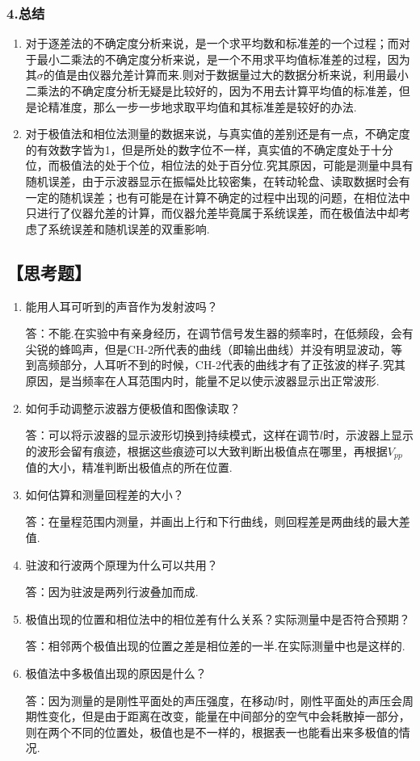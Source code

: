 \documentclass[12pt,a4paper,UTF8]{ctexart}
\begin{document}
	\subsubsection*{4.总结}
	\begin{enumerate}[(1)]
	\item 对于逐差法的不确定度分析来说，是一个求平均数和标准差的一个过程；而对于最小二乘法的不确定度分析来说，是一个不用求平均值标准差的过程，因为其$\sigma$的值是由仪器允差计算而来.则对于数据量过大的数据分析来说，利用最小二乘法的不确定度分析无疑是比较好的，因为不用去计算平均值的标准差，但是论精准度，那么一步一步地求取平均值和其标准差是较好的办法.
	\item 对于极值法和相位法测量的数据来说，与真实值的差别还是有一点，不确定度的有效数字皆为1，但是所处的数字位不一样，真实值的不确定度处于十分位，而极值法的处于个位，相位法的处于百分位.究其原因，可能是测量中具有随机误差，由于示波器显示在振幅处比较密集，在转动轮盘、读取数据时会有一定的随机误差；也有可能是在计算不确定的过程中出现的问题，在相位法中只进行了仪器允差的计算，而仪器允差毕竟属于系统误差，而在极值法中却考虑了系统误差和随机误差的双重影响.
	\end{enumerate}
	\subsection*{【思考题】}
	\begin{enumerate}[(1)]
	\item 能用人耳可听到的声音作为发射波吗？\par
	答：不能.在实验中有亲身经历，在调节信号发生器的频率时，在低频段，会有尖锐的蜂鸣声，但是CH-2所代表的曲线（即输出曲线）并没有明显波动，等到高频部分，人耳听不到的时候，CH-2代表的曲线才有了正弦波的样子.究其原因，是当频率在人耳范围内时，能量不足以使示波器显示出正常波形.
	\item 如何手动调整示波器方便极值和图像读取？\par
	答：可以将示波器的显示波形切换到持续模式，这样在调节$l$时，示波器上显示的波形会留有痕迹，根据这些痕迹可以大致判断出极值点在哪里，再根据$V_{pp}$值的大小，精准判断出极值点的所在位置.
	\item 如何估算和测量回程差的大小？\par
	答：在量程范围内测量，并画出上行和下行曲线，则回程差是两曲线的最大差值.
	\item 驻波和行波两个原理为什么可以共用？\par
	答：因为驻波是两列行波叠加而成.
	\item 极值出现的位置和相位法中的相位差有什么关系？实际测量中是否符合预期？\par
	答：相邻两个极值出现的位置之差是相位差的一半.在实际测量中也是这样的.
	\item 极值法中多极值出现的原因是什么？\par
	答：因为测量的是刚性平面处的声压强度，在移动$l$时，刚性平面处的声压会周期性变化，但是由于距离在改变，能量在中间部分的空气中会耗散掉一部分，则在两个不同的位置处，极值也是不一样的，根据表一也能看出来多极值的情况.
	\end{enumerate}
	
	
\end{document}
